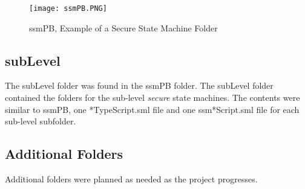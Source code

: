 \begin{figure}[h]
  \centering
  \texttt{[image: ssmPB.PNG]}
  \caption{ssmPB, Example of a Secure State Machine Folder}
\end{figure}

\subsection{subLevel}
\label{sec:sublevel}
The subLevel folder was found in the ssmPB folder.  The subLevel folder contained the folders for the sub-level \emph{secure} state machines.  The contents were similar to ssmPB, one *TypeScript.sml file and one ssm*Script.sml file for each sub-level subfolder.

\subsection{Additional Folders}
\label{sec:additional-folders}

Additional folders were planned as needed as the project progresses.









